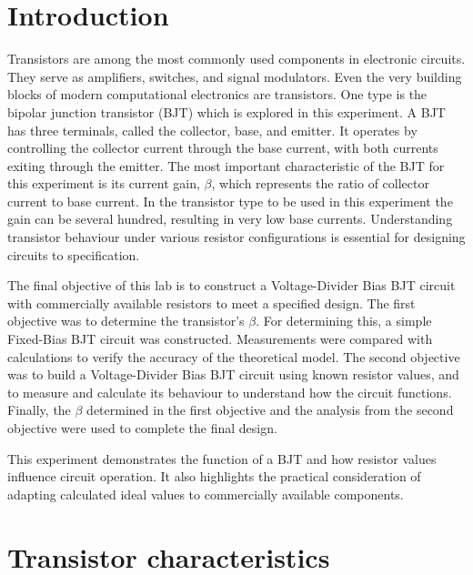 \documentclass{article}
\begin{document}
\section{Introduction}
Transistors are among the most commonly used components in electronic circuits. They serve as amplifiers, switches, and signal modulators.
Even the very building blocks of modern computational electronics are transistors.
One type is the bipolar junction transistor (BJT) which is explored in this experiment.
A BJT has three terminals, called the collector, base, and emitter.
It operates by controlling the collector current through the base current, with both currents exiting through the emitter.
The most important characteristic of the BJT for this experiment is its current gain, \(\beta\), which represents the ratio of collector current to base current.
In the transistor type to be used in this experiment the gain can be several hundred, resulting in very low base currents.
Understanding transistor behaviour under various resistor configurations is essential for designing circuits to specification.

The final objective of this lab is to construct a Voltage-Divider Bias BJT circuit with commercially available resistors to meet a specified design.
The first objective was to determine the transistor's \(\beta\).
For determining this, a simple Fixed-Bias BJT circuit was constructed.
Measurements were compared with calculations to verify the accuracy of the theoretical model.
The second objective was to build a Voltage-Divider Bias BJT circuit using known resistor values, and to measure and calculate its behaviour to understand how the circuit functions.
Finally, the \(\beta\) determined in the first objective and the analysis from the second objective were used to complete the final design.

This experiment demonstrates the function of a BJT and how resistor values influence circuit operation.
It also highlights the practical consideration of adapting calculated ideal values to commercially available components.


\section{Transistor characteristics}

\end{document}
